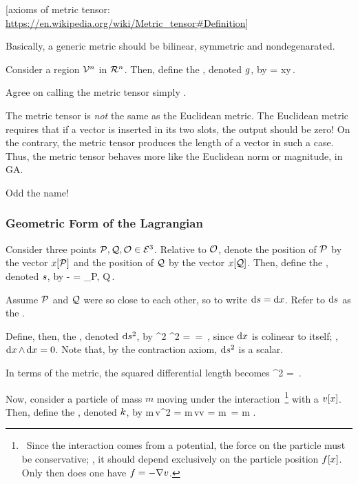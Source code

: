 [axioms of metric tensor: \url{https://en.wikipedia.org/wiki/Metric_tensor#Definition}]

Basically, a generic metric should be bilinear, symmetric and nondegenarated.

Consider a region $\mathcal{V}^{n}$ in $\mathcal{R}^{n}$. Then, define the , denoted $g$, by
\beq
\metric{}  {} = x\iprod y\,.
\eeq

Agree on calling the metric tensor simply .

\begin{remark}
The metric tensor is \emph{not} the same as the Euclidean metric. The Euclidean metric requires that if a vector is inserted in its two slots, the output should be zero! On the contrary, the metric tensor produces the length of a vector in such a case. Thus, the metric tensor behaves more like the Euclidean norm or magnitude, in GA.

Odd the name!
\end{remark}


\subsubsection{Geometric Form of the Lagrangian}
Consider three points $\mathcal{P}, \mathcal{Q}, \mathcal{O}\in\mathcal{E}^{3}$. Relative to $\mathcal{O}$, denote the position of $\mathcal{P}$ by the vector $x\!\left[{\mathcal{P}}\right]$ and the position of $\mathcal{Q}$ by the vector $x\!\left[{\mathcal{Q}}\right]$. Then, define the , denoted $s$, by
\beq
\diff\svec {} \pvec{} - \pvec{} = \diff\pvec_{\point P, \point Q}\,.
\eeq

Assume $\mathcal{P}$ and $\mathcal{Q}$ were so close to each other, so to write $\text{d}s = \text{d}x$. Refer to $\text{d}s$ as the .

Define, then, the , denoted $\text{d}s^2$, by
\beq
\dx\svec^2  \dx\pvec^2 = \dx\pvec\,\dx\pvec = \dx\pvec\iprod\dx\pvec\,,
\eeq
since $\text{d}x$ is colinear to itself; \ie, $\text{d}x\operatorname{\wedge}\text{d}x = 0$. Note that, by the contraction axiom, $\text{d}s^2$ is a scalar.

In terms of the metric, the squared differential length becomes
\beq
\dx\svec^2 = \metric\vat{\dx\pvec, \dx\pvec}\,.
\eeq

Now, consider a particle of mass $m$ moving under the interaction~\footnote{~Since the interaction comes from a potential, the force on the particle must be conservative; \ie, it should depend exclusively on the particle position $f\!\left[{x}\right]$. Only then does one have $f = -\nabla v$.} with a  $v\!\left[{x}\right]$. Then, define the , denoted $k$, by
\beq
\ken\vat{\dt\pvec}  {}m\,v^2 
                    = m\,v\iprod v 
                    = m\,\dt\pvec\iprod\dt\pvec 
                    = m\,\metric\vat{\dt\pvec,\dt\pvec}\,.
\eeq

